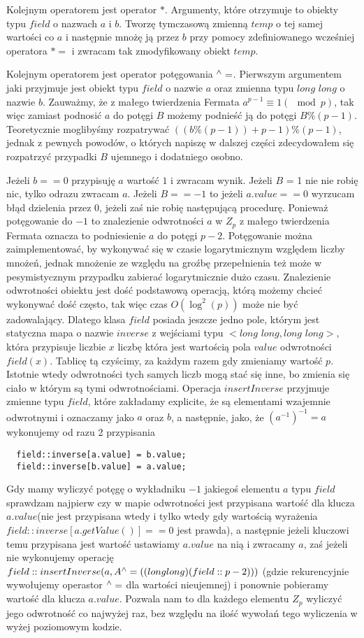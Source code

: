 \documentclass{article}
\begin{document}
Kolejnym operatorem jest operator $*$. Argumenty, które otrzymuje
to obiekty typu $field$ o nazwach $a$ i $b$. Tworzę tymczasową zmienną $temp$
o tej samej wartości co $a$ i następnie mnożę ją przez $b$ przy pomocy
zdefiniowanego wcześniej operatora $*=$ i zwracam tak zmodyfikowany obiekt $temp$.

Kolejnym operatorem jest operator potęgowania $\textsuperscript{$\wedge$}=$. Pierwszym argumentem jaki przyjmuje 
jest obiekt typu $field$ o nazwie $a$ oraz zmienna typu $long$ $long$ o
nazwie $b$. Zauważmy, że z małego twierdzenia Fermata $a^{p-1} \equiv 1 (\mod p) $, tak więc
zamiast podnosić $a$ do potęgi $B$ możemy podnieść ją do potęgi $B\%(p-1)$.
Teoretycznie moglibyśmy rozpatrywać $((b\%(p-1))+p-1) \% (p - 1)$, jednak z pewnych powodów, o 
których napiszę w dalszej części zdecydowałem się rozpatrzyć przypadki $B$ ujemnego i 
dodatniego osobno. 

Jeżeli $b==0$ przypisuję $a$ wartość $1$ i zwracam wynik. Jeżeli $B$ = 1 nie 
nie robię nic, tylko odrazu zwracam $a$. Jeżeli $B==-1$ to jeżeli $a.value==0$ 
wyrzucam błąd dzielenia przez $0$, jeżeli zaś nie robię następującą procedurę.
Ponieważ potęgowanie do $-1$ to znalezienie odwrotności $a$ w $Z_p$
z małego twierdzenia Fermata oznacza to podniesienie $a$ do potęgi 
$p-2$. Potęgowanie można zaimplementować, by wykonywać się w czasie logarytmicznym
względem liczby mnożeń, jednak mnożenie ze względu na groźbę przepełnienia
też może w pesymistycznym przypadku zabierać logarytmicznie dużo czasu.
Znalezienie odwrotności obiektu jest dość podstawową operacją, którą 
możemy chcieć wykonywać dość często, tak więc czas $O(\log ^2(p))$ może
nie być zadowalający. Dlatego klasa $field$ posiada jeszcze jedno pole, którym
jest statyczna mapa o nazwie $inverse$ z wejściami typu $<long$ $long,long$ $long>$, która przypisuje 
liczbie $x$ liczbę która jest wartością pola $value$ odwrotności $field(x)$. Tablicę tą 
czyścimy, za każdym razem gdy zmieniamy wartość $p$. Istotnie wtedy odwrotności
tych samych liczb mogą stać się inne, bo zmienia się ciało w którym są tymi odwrotnościami.
Operacja $insertInverse$ przyjmuje zmienne typu $field$, które zakładamy
explicite, że są elementami wzajemnie odwrotnymi i oznaczamy jako $a$ oraz $b$, 
a następnie, jako, że $(a^{-1})^{-1}=a$ wykonujemy od razu 2 przypisania
\begin{lstlisting}
  field::inverse[a.value] = b.value;
  field::inverse[b.value] = a.value;
\end{lstlisting}
Gdy mamy wyliczyć potęgę o wykładniku $-1$ jakiegoś elementu $a$ typu $field$ sprawdzam 
najpierw czy w mapie odwrotności jest przypisana wartość dla klucza $a.value$(nie jest
przypisana wtedy i tylko wtedy gdy wartością wyrażenia $field::inverse[a.getValue()] == 0$ jest
prawda), a następnie jeżeli kluczowi temu przypisana jest wartość ustawiamy $a.value$ na nią i zwracamy $a$, zaś
jeżeli nie wykonujemy operację $field::insertInverse(a, A\textsuperscript{$\wedge$}=(( long long)(field::p-2)))$
(gdzie rekurencyjnie wywołujemy operastor $\textsuperscript{$\wedge$}=$ dla wartości nieujemnej)
i ponownie pobieramy wartość dla klucza $a.value$. Pozwala nam to dla każdego elementu $Z_p$ wyliczyć
jego odwrotność co najwyżej raz, bez względu na ilość wywołań tego wyliczenia w wyżej poziomowym 
kodzie. 
\end{document}

